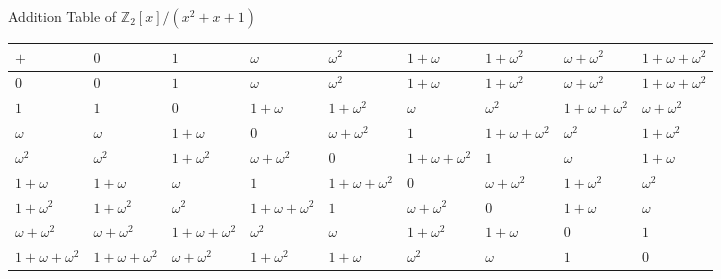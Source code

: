 \documentclass[ %
 10pt, xcolor={dvipsnames,svgnames,x11names,hyperref},
   hyperref={colorlinks=true,citecolor=green,linkcolor=DarkRed,urlcolor=ProcessBlue,anchorcolor=blue}
  ]{beamer}
\newcommand{\Z}{\mathbb{Z}}
\begin{document}
\begin{frame}{Addition Table of $\Z_2[x]/(x^2+x+1)$}

\begin{table}[]
\tiny{
\begin{tabular}{ p{8mm}|p{8mm}|p{8mm} |p{8mm}|p{8mm}|p{8mm}|p{8mm}|p{8mm}|p{8mm}}
$+$  & $0$ & $1$ & $\omega$ & $\omega^2$ & $1+\omega$ & $1+\omega^2$ & $\omega+\omega^2$ & $1+\omega+\omega^2$ \\
\hline
$0$ &$0$ & $1$ & $\omega$ & $\omega^2$ & $1+\omega$ & $1+\omega^2$ & $\omega+\omega^2$ & $1+\omega+\omega^2$   \\ 
\hline
$1$ & $1$ & $0$ & $1+\omega$ & $1+\omega^2$ & $\omega$ & $\omega^2$ & $1+\omega+\omega^2$ & $\omega+\omega^2$  \\ 
\hline
$\omega$ & $\omega$ & $1+\omega$ & $0$ & $\omega+\omega^2$  & $1$ & $1+\omega+\omega^2$ & $\omega^2$ & $1+\omega^2$\\ 
\hline
$\omega^2$ & $\omega^2$& $1+\omega^2$ & $\omega+\omega^2$&$0$ & $1+\omega+\omega^2$ &$1$& $\omega$ & $ 1+\omega$\\
\hline
$1+\omega$ & $1+\omega$& $\omega$ & $1$&$1+\omega+\omega^2$ & $0$ &$\omega+\omega^2$& $1+\omega^2$ & $\omega^2$\\
\hline
$1+\omega^2$ & $1+\omega^2$& $\omega^2$&$1+\omega+\omega^2$ & $1$&$\omega+\omega^2$ &$0$& $1+\omega$ & $\omega$\\
\hline
$\omega+\omega^2$ & $\omega+\omega^2$&$1+\omega+\omega^2$& $\omega^2$&$\omega$ & $1+\omega^2$&$1+\omega$ &$0$& $1$\\
\hline
$1+\omega+\omega^2$ & $1+\omega+\omega^2$&$\omega+\omega^2$& $1+\omega^2$&$1+\omega$ & $\omega^2$&$\omega$ &$1$& $0$\\

\end{tabular}
}
\end{table}
\end{frame}
\end{document}
